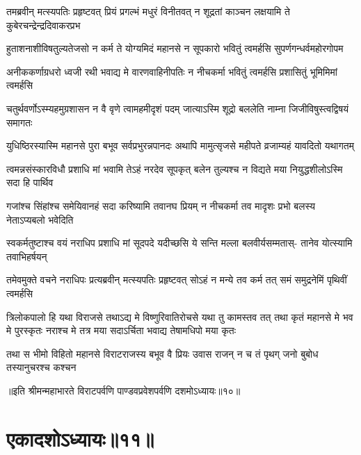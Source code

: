 \fourlineindentedshloka
{तमब्रवीन् मत्स्यपतिः प्रहृष्टवत्}
{प्रियं प्रगल्भं मधुरं विनीतवत्}
{न शूद्रतां काञ्चन लक्षयामि ते}
{कुबेरचन्द्रेन्द्रदिवाकरप्रभ}


\fourlineindentedshloka
{हुताशनाशीविषतुल्यतेजसो}
{न कर्म ते योग्यमिदं महानसे}
{न सूपकारो भवितुं त्वमर्हसि}
{सुपर्णगन्धर्वमहोरगोपम}


\fourlineindentedshloka
{अनीककर्णाग्रधरो ध्वजी रथी}
{भवाद्य मे वारणवाहिनीपतिः}
{न नीचकर्मा भवितुं त्वमर्हसि}
{प्रशासितुं भूमिमिमां त्वमर्हसि}




\fourlineindentedshloka
{चतुर्थवर्णोऽस्म्यहमुग्रशासन}
{न वै वृणे त्वामहमीदृशं पदम्}
{जात्याऽस्मि शूद्रो बललेति नाम्ना}
{जिजीविषुस्त्वद्विषयं समागतः}


\fourlineindentedshloka
{युधिष्ठिरस्यास्मि महानसे पुरा}
{बभूव सर्वप्रभुरन्नपानदः}
{अथापि मामुत्सृजसे महीपते}
{व्रजाम्यहं यावदितो यथागतम्}


\fourlineindentedshloka
{त्वमन्नसंस्कारविधौ प्रशाधि मां}
{भवामि तेऽहं नरदेव सूपकृत्}
{बलेन तुल्यश्च न विद्यते मया}
{नियुद्धशीलोऽस्मि सदा हि पार्थिव}


\fourlineindentedshloka
{गजांश्च सिंहांश्च समेयिवानहं}
{सदा करिष्यामि तवानघ प्रियम्}
{न नीचकर्मा तव मादृशः प्रभो}
{बलस्य नेताऽप्यबलो भवेदिति}


\fourlineindentedshloka
{स्वकर्मतुष्टाश्च वयं नराधिप}
{प्रशाधि मां सूदपदे यदीच्छसि}
{ये सन्ति मल्ला बलवीर्यसम्मतास्-}
{तानेव योत्स्यामि तवाभिहर्षयन्}



\fourlineindentedshloka
{तमेवमुक्ते वचने नराधिपः}
{प्रत्यब्रवीन् मत्स्यपतिः प्रहृष्टवत्}
{सोऽहं न मन्ये तव कर्म तत् समं}
{समुद्रनेमिं पृथिवीं त्वमर्हसि}


\sixlineindentedshloka
{त्रिलोकपालो हि यथा विराजसे}
{तथाऽद्य मे विष्णुरिवातिरोचसे}
{यथा तु कामस्तव तत् तथा कृतं}
{महानसे मे भव मे पुरस्कृतः}
{नराश्च मे तत्र मया सदाऽर्चिता}
{भवाद्य तेषामधिपो मया कृतः}


\fourlineindentedshloka
{तथा स भीमो विहितो महानसे}
{विराटराजस्य बभूव वै प्रियः}
{उवास राजन् न च तं पृथग् जनो}
{बुबोध तस्यानुचरश्च कश्चन}

॥इति श्रीमन्महाभारते विराटपर्वणि पाण्डवप्रवेशपर्वणि दशमोऽध्यायः॥१०॥

\chapter{एकादशोऽध्यायः॥११॥}

